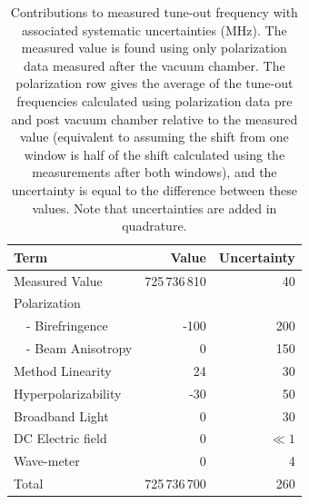 	\begin{table}
	\centering
	\begin{tabular}{l|r|r}
	\hline\hline
	Term              & Value &  Uncertainty \\
	\hline
	Measured Value      & 725\,736\,810             & 40      \\
	Polarization        & & \\
	\, \, - Birefringence & -100                   & 200   \\
	\, \, - Beam Anisotropy & 0                   & 150   \\
	Method Linearity    & 24                   & 30       \\
	Hyperpolarizability           & -30                   & 50   \\
	Broadband Light     & 0                     & 30      \\
	DC Electric field   & 0                     & \(\ll 1\) \\
	Wave-meter          & 0                     & 4    \\
	\hline
	Total               &  725\,736\,700            &  260\\
	\hline\hline
	\end{tabular}
	\caption{Contributions to measured tune-out frequency with associated systematic uncertainties (MHz). The measured value is found using only polarization data measured after the vacuum chamber. The polarization row gives the average of the tune-out frequencies calculated using polarization data pre and post vacuum chamber relative to the measured value (equivalent to assuming the shift from one window is half of the shift calculated using the measurements after both windows), and the uncertainty is equal to the difference between these values. Note that uncertainties are added in quadrature.}
	\label{tab:results}
	\end{table}
	
